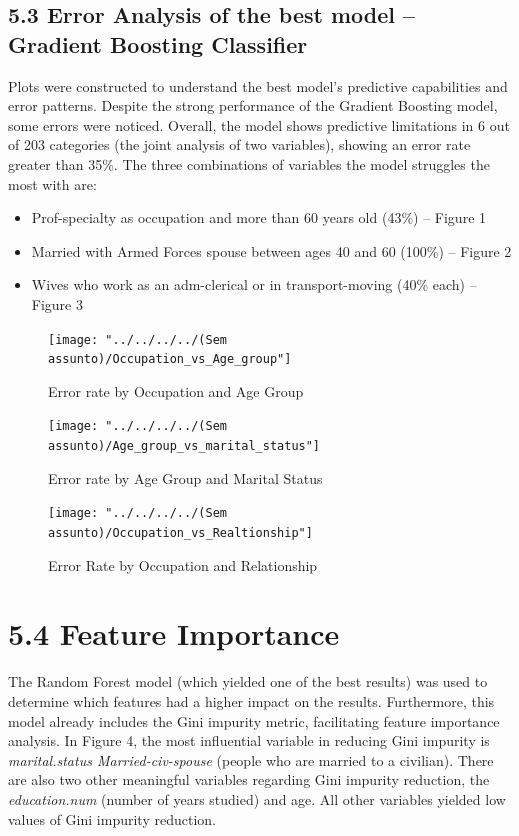 \documentclass[a4paper,oneside,bibliography=totoc]{scrbook}
\begin{document}
\subsection*{5.3 Error Analysis of the best model – Gradient Boosting Classifier}

Plots were constructed to understand the best model’s predictive capabilities and error
patterns. Despite the strong performance of the Gradient Boosting model, some errors
were noticed. Overall, the model shows predictive limitations in 6 out of 203 categories
(the joint analysis of two variables), showing an error rate greater than 35\%. The three
combinations of variables the model struggles the most with are:
 

\begin{itemize}
	\item Prof-specialty as occupation and more than 60 years old (43\%) – Figure 1
	\item Married with Armed Forces spouse between ages 40 and 60 (100\%) – Figure 2 
	\item Wives who work as an adm-clerical or in transport-moving (40\% each) – Figure 3
\end{itemize}


\begin{figure}[H]
	\centering
	\texttt{[image: "../../../../(Sem assunto)/Occupation\_vs\_Age\_group"]}
	\caption{Error rate by Occupation and Age Group}
	\label{fig:occupationvsagegroup}
\end{figure}

\begin{figure}[H]
	\centering
	\texttt{[image: "../../../../(Sem assunto)/Age\_group\_vs\_marital\_status"]}
	\caption{Error rate by Age Group and Marital Status}
	\label{fig:agegroupvsmaritalstatus}
\end{figure}


\begin{figure}[H]
	\centering
	\texttt{[image: "../../../../(Sem assunto)/Occupation\_vs\_Realtionship"]}
	\caption{Error Rate by Occupation and Relationship}
	\label{fig:occupationvsrealtionship}
\end{figure}



\section*{5.4 Feature Importance}

The Random Forest model (which yielded one of the best results) was used to determine which features had a higher impact on the results. Furthermore, this model already includes the Gini impurity metric, facilitating feature importance analysis. In Figure 4, the most influential variable in reducing Gini impurity is \textit{marital.status Married-civ-spouse} (people who are married to a civilian). There are also two other meaningful variables regarding Gini impurity reduction, the \textit{education.num} (number of years studied) and age. All other variables yielded low values of Gini impurity reduction.
\end{document}
